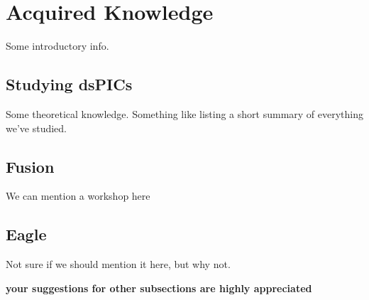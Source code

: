 \section{Acquired Knowledge} %

Some introductory info.

\subsection{Studying dsPICs}

Some theoretical knowledge.
Something like listing a short summary of everything we've studied. 

\subsection{Fusion}

We can mention a workshop here

\subsection{Eagle}

Not sure if we should mention it here, but why not.

\textbf{your suggestions for other subsections are highly appreciated}
